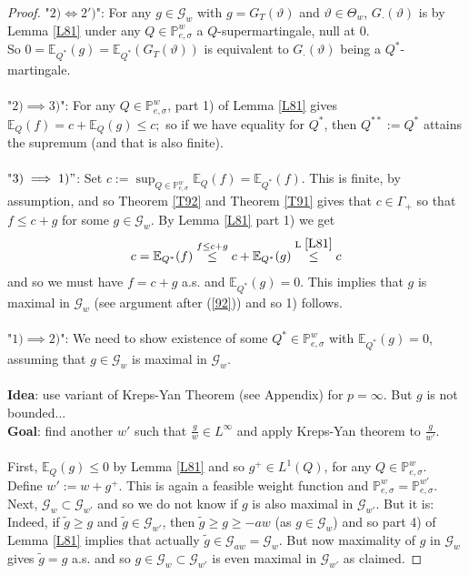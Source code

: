 \documentclass[12pt,a4paper, twoside]{article}
\theoremstyle{definition}
\newcommand{\EE}{\mathbb{E}} %
\newcommand{\PP}{\mathbb{P}} %
\begin{document}
\begin{proof}
"$2) \iff 2')$": For any $g \in \mathcal{G}_w$ with $g= G_T( \vartheta)$ and $\vartheta \in \Theta_w$, $G_\cdot( \vartheta)$ is by Lemma \ref{L81} under any $Q \in \PP_{e, \sigma}^w$ a $Q$-supermartingale, null at $0$. \\ So $ 0 = \EE_{Q^*}(g)= \EE_{Q^*}(G_T( \vartheta))$ is equivalent to $G_\cdot( \vartheta)$ being a $Q^*$-martingale. 
\\\\
"$2) \implies 3)$": For any $Q \in \PP_{e, \sigma}^w$, part 1) of Lemma \ref{L81} gives $\EE_Q(f) = c + \EE_Q(g) \leq c;$ so if we have equality for $Q^*$, then $Q^{**}:= Q^*$ attains the supremum (and that is also finite). 
\\\\ 
"$3) \implies 1)"$: Set $c:= \sup_{Q \in \PP_{e, \sigma}^w} \EE_Q(f)= \EE_{Q^*}(f)$. This is finite, by assumption, and so Theorem \ref{T92} and Theorem \ref{T91} gives that $c \in \Gamma_+$ so that $f \leq c + g$ for some $g \in \mathcal{G}_w$. By Lemma \ref{L81} part 1) we get 
\begin{align*}
c= \EE_{Q^*}(f) \overset{f \leq c+g}\leq c + \EE_{Q^*}(g) \overset{\text{L } \ref{L81}}\leq c
\end{align*}
and so we must have $f= c+g$ a.s. and $\EE_{Q^*}(g) =0$. This implies that $g$ is maximal in $\mathcal{G}_w$ (see argument after (\ref{92})) and so 1) follows. 
\\\\
"$1) \implies 2)$": We need to show existence of some $Q^* \in \PP_{e, \sigma}^w$ with $\EE_{Q^*}(g)=0$, assuming that $g \in \mathcal{G}_w$ is maximal in $\mathcal{G}_w$. \\\\
\textbf{Idea}: use variant of Kreps-Yan Theorem (see Appendix) for $p= \infty$. But $g$ is not bounded...
\\
\textbf{Goal}: find another $w'$ such that $\frac{g}{w} \in L^\infty$ and apply Kreps-Yan theorem to $\frac{g}{w'}.$
\\\\
First, $\EE_Q(g) \leq 0$ by Lemma \ref{L81} and so $g^+ \in L^1(Q)$, for any $Q \in \PP_{e, \sigma}^w$. Define $w' := w+g^+$. This is again a feasible weight function and $\PP_{e,  \sigma}^w= \PP_{e, \sigma}^{w'}$. Next, $\mathcal{G}_w \subset \mathcal{G}_{w'}$ and so we do not know if $g$ is also maximal in $\mathcal{G}_{w'}$. But it is: Indeed, if $\widetilde{g} \geq g$ and $\widetilde{g} \in \mathcal{G}_{w'}$, then $\widetilde{g} \geq g \geq -aw$ (as $g \in \mathcal{G}_w$) and so part 4) of Lemma \ref{L81} implies that actually $\widetilde{g} \in \mathcal{G}_{aw} = \mathcal{G}_w$. But now maximality of $g$ in $\mathcal{G}_w$ gives $\widetilde{g} = g$ a.s. and so $g \in \mathcal{G}_w \subset \mathcal{G}_{w'}$ is even maximal in $\mathcal{G}_{w'}$ as claimed. 

\end{proof}
\end{document}
